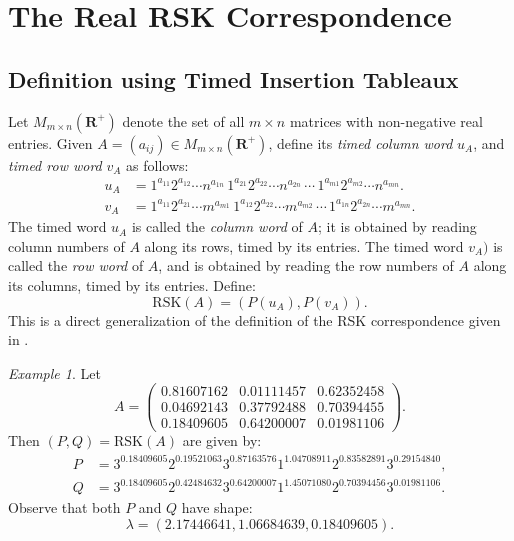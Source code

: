 \documentclass[10pt]{amsproc}
\theoremstyle{definition}
\theoremstyle{remark}
\newtheorem{example}[theorem]{Example}
\newcommand{\rp}{\mathbf{R}^+}
\newcommand{\rsk}{\mathrm{RSK}}
\begin{document}
\section{The Real RSK Correspondence}
\label{sec:rsk}
\subsection{Definition using Timed Insertion Tableaux}
\label{sec:defin-using-timed}
Let $M_{m\times n}(\rp)$ denote the set of all $m\times n$ matrices with non-negative real entries.
Given $A=(a_{ij})\in M_{m\times n}(\rp)$, define its \emph{timed column word} $u_A$, and \emph{timed row word} $v_A$ as follows:
\begin{align*}
  u_A & = 1^{a_{11}}2^{a_{12}}\dotsb n^{a_{1n}}\,1^{a_{21}}2^{a_{22}}\dotsb n^{a_{2n}}\,\dotsb \,1^{a_{m1}}2^{a_{m2}}\dotsb n^{a_{mn}}.\\
  v_A & = 1^{a_{11}}2^{a_{21}}\dotsb m^{a_{m1}}\,1^{a_{12}}2^{a_{22}}\dotsb m^{a_{m2}}\,\dotsb \,1^{a_{1n}}2^{a_{2n}}\dotsb m^{a_{mn}}.
\end{align*}
The timed word $u_A$ is called the \emph{column word} of $A$; it is obtained by reading column numbers of $A$ along its rows, timed by its entries.
The timed word $v_A)$ is called the \emph{row word} of $A$, and is obtained by reading the row numbers of $A$ along its columns, timed by its entries.
Define:
\begin{equation}
  \label{eq:rsk}
  \rsk(A) = (P(u_A), P(v_A)).
\end{equation}
This is a direct generalization of the definition of the RSK correspondence given in \cite[Section~18]{schur_poly}.
\begin{example}
  Let
  \begin{displaymath}
    A = 
    \begin{pmatrix}
      0.81607162 & 0.01111457 & 0.62352458 \\
      0.04692143 & 0.37792488 & 0.70394455 \\
      0.18409605 & 0.64200007 & 0.01981106
    \end{pmatrix}.
  \end{displaymath}
  Then $(P, Q) = \rsk(A)$ are given by:
  \begin{align*}
    P & = 3^{0.18409605}2^{0.19521063}3^{0.87163576}1^{1.04708911}2^{0.83582891}3^{0.29154840},\\
    Q & = 3^{0.18409605}2^{0.42484632}3^{0.64200007}1^{1.45071080}2^{0.70394456}3^{0.01981106}.
  \end{align*}
  Observe that both $P$ and $Q$ have shape:
  \begin{displaymath}
    \lambda = (2.17446641, 1.06684639, 0.18409605).
  \end{displaymath}
\end{example}
\end{document}
